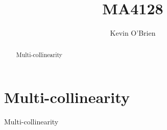 \documentclass[12pt]{article}
\title{MA4128}
\author{Kevin O'Brien}
\begin{document}
\maketitle

\begin{abstract}
Multi-collinearity
\end{abstract}

\section{Multi-collinearity}
Multi-collinearity
\end{document}
